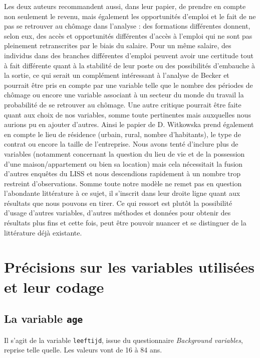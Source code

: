 \documentclass[a4paper, french, 11 pt]{article}\usepackage[]{graphicx}\usepackage[]{xcolor}
\begin{document}
          Les deux auteurs recommandent aussi, dans leur papier, de prendre en compte non seulement le revenu, mais également les opportunités d’emploi et le fait de ne pas se retrouver au chômage dans l’analyse : des formations différentes donnent, selon eux, des accès et opportunités différentes d’accès à l’emploi qui ne sont pas pleinement retranscrites par le biais du salaire. Pour un même salaire, des individus dans des branches différentes d’emploi peuvent avoir une certitude tout à fait différente quant à la stabilité de leur poste ou des possibilités d’embauche à la sortie, ce qui serait un complément intéressant à l’analyse de Becker et pourrait être pris en compte par une variable telle que le nombre des périodes de chômage ou encore une variable associant à un secteur du monde du travail la probabilité de se retrouver au chômage.
          Une autre critique pourrait être faite quant aux choix de nos variables, somme toute pertinentes mais auxquelles nous aurions pu en ajouter d’autres. Ainsi le papier de D. Witkowska prend également en compte le lieu de résidence (urbain, rural, nombre d’habitants), le type de contrat ou encore la taille de l’entreprise. Nous avons tenté d’inclure plus de variables (notamment concernant la question du lieu de vie et de la possession d’une maison/appartement ou bien sa location) mais cela nécessitait la fusion d’autres enquêtes du LISS et nous descendions rapidement à un nombre trop restreint d’observations.
         Somme toute notre modèle ne remet pas en question l’abondante littérature à ce sujet, il s’inscrit dans leur droite ligne quant aux résultats que nous pouvons en tirer. Ce qui ressort est plutôt la possibilité d’usage d’autres variables, d’autres méthodes et données pour obtenir des résultats plus fins et cette fois, peut être pouvoir nuancer et se distinguer de la littérature déjà existante.

\printbibliography

\appendix
\appendixpage
\addappheadtotoc

\section{Précisions sur les variables utilisées et leur codage}

\subsection{La variable \texttt{age}}

Il s’agit de la variable \texttt{leeftijd}, issue du questionnaire \textit{Background variables}, reprise telle quelle. Les valeurs vont de 16 à 84 ans. 
\end{document}
